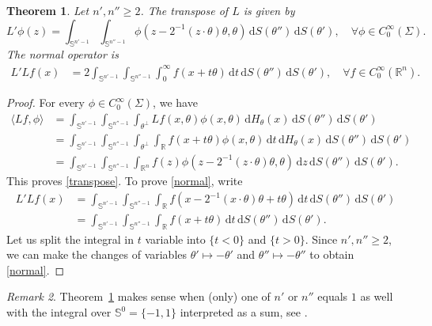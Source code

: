 \documentclass[11pt]{amsart}
\newtheorem{theorem}{Theorem}[section]
\theoremstyle{definition}
\theoremstyle{remark}
\newtheorem{remark}[theorem]{Remark}
\numberwithin{equation}{section}
\newcommand{\Rn}{\mathbb{R}^n}
\newcommand{\rb}{\mathbb{R}}
\renewcommand{\d}{\,\mathrm{d}}
\renewcommand{\sb}{\mathbb{S}}
\begin{document}
\begin{theorem}\label{th:normal}
	Let $n', n'' \geq 2$. The transpose of $L$ is given by 
	\begin{equation}\label{transpose}
		L' \phi (z) = \int_{\sb^{n'-1}} \int_{\sb^{n''-1}} \phi(z- {2^{-1}}(z \cdot \theta) \theta, \theta) \d S(\theta'') \d S(\theta'), \quad \forall \phi\in C_0^\infty(\Sigma). 
	\end{equation}
The normal operator is
	\begin{align}\label{normal}
		L'Lf(x) &= 2 \int_{\sb^{n'-1}} \int_{\sb^{n''-1}} \int_{0}^{\infty} f\left ( x + t \theta \right) \d  t \d S(\theta'') \d S(\theta'), \quad \forall f\in C_0^\infty(\rb^n). 
	\end{align}
\end{theorem}
\begin{proof}
	 For every $\phi\in C_0^\infty(\Sigma)$, we have 
\begin{equation}
    \begin{split}
        \langle Lf, \phi \rangle &= \int_{\sb^{n'-1}} \int_{\sb^{n''-1}}   \int_{\theta^\perp} Lf (x, \theta) \phi (x, \theta) \d H_\theta(x)  \d S(\theta'') \d S(\theta')\\
        &= \int_{\sb^{n'-1}} \int_{\sb^{n''-1}}   \int_{\theta^\perp} \int_{\rb} f (x+ t \theta) \phi (x, \theta) \d t \d H_\theta(x) \d S(\theta'') \d S(\theta') \\
        &= \int_{\sb^{n'-1}} \int_{\sb^{n''-1}}   \int_{\Rn} f (z) \phi (z- {2^{-1}}(z\cdot\theta)\theta, \theta)\d z \d S(\theta'') \d S(\theta')   .    
    \end{split}
\end{equation}
This proves \eqref{transpose}.  To prove \eqref{normal}, write 
\begin{align}
	L'Lf(x) &= \int_{\sb^{n'-1}} \int_{\sb^{n''-1}} \int_{\rb} f\left ( x - {2^{-1}}(x\cdot  \theta )  \theta + t \theta \right) \d  t \d S(\theta'') \d S(\theta') \\
	&= \int_{\sb^{n'-1}} \int_{\sb^{n''-1}} \int_{\rb} f\left ( x + t \theta \right) \d  t \d S(\theta'') \d S(\theta').  \label{L'Lf}
\end{align}
Let us split the integral in $t$ variable into $\{t < 0\}$ and $\{t> 0\}$. Since $n',n'' \geq 2$, we can make the changes of variables $\theta' \mapsto -\theta'$ and $\theta'' \mapsto -\theta''$ to obtain \eqref{normal}. 
\end{proof}
\begin{remark}
Theorem~\ref{th:normal} makes sense when (only) one of $n'$ or $n''$ equals $1$ as well with the integral over $\sb^0=\{-1,1\}$ interpreted as a sum, see \cite{SU-book}.
\end{remark}
 
\end{document}
